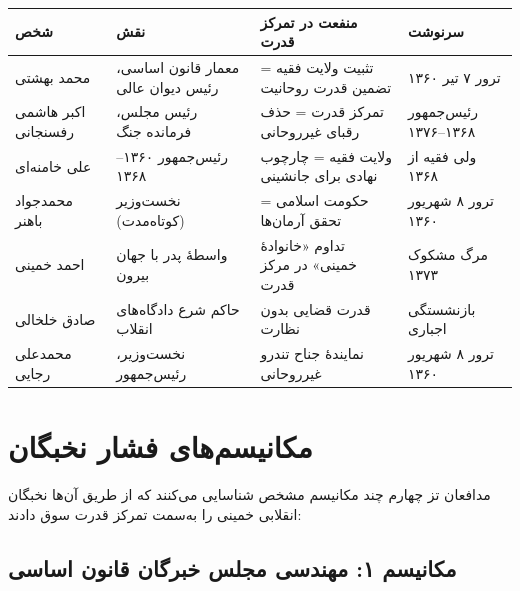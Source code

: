 \documentclass[12pt,a4paper]{book}
\begin{document}
\begin{principleBox}
\begin{longtable}{%
    >{\raggedleft\arraybackslash}p{}
    >{\raggedleft\arraybackslash}p{}
    >{\raggedleft\arraybackslash}p{}
    >{\raggedleft\arraybackslash}p{}}
\toprule
\rowcolor{cConsolid!10}
\textbf{شخص} & \textbf{نقش} & \textbf{منفعت در تمرکز قدرت} & \textbf{سرنوشت} \\
\midrule
\endhead

محمد بهشتی &
معمار قانون اساسی، رئیس دیوان عالی &
تثبیت ولایت فقیه = تضمین قدرت روحانیت &
ترور ۷ تیر ۱۳۶۰ \\
\midrule

اکبر هاشمی رفسنجانی &
رئیس مجلس، فرمانده جنگ &
تمرکز قدرت = حذف رقبای غیرروحانی &
رئیس‌جمهور ۱۳۶۸–۱۳۷۶ \\
\midrule

علی خامنه‌ای &
رئیس‌جمهور ۱۳۶۰–۱۳۶۸ &
ولایت فقیه = چارچوب نهادی برای جانشینی &
ولی فقیه از ۱۳۶۸ \\
\midrule

محمدجواد باهنر &
نخست‌وزیر (کوتاه‌مدت) &
حکومت اسلامی = تحقق آرمان‌ها &
ترور ۸ شهریور ۱۳۶۰ \\
\midrule

احمد خمینی &
واسطهٔ پدر با جهان بیرون &
تداوم «خانوادهٔ خمینی» در مرکز قدرت &
مرگ مشکوک ۱۳۷۳ \\
\midrule

صادق خلخالی &
حاکم شرع دادگاه‌های انقلاب &
قدرت قضایی بدون نظارت &
بازنشستگی اجباری \\
\midrule

محمدعلی رجایی &
نخست‌وزیر، رئیس‌جمهور &
نمایندهٔ جناح تندرو غیرروحانی &
ترور ۸ شهریور ۱۳۶۰ \\

\bottomrule
\end{longtable}
\end{principleBox}

\section{مکانیسم‌های فشار نخبگان}

مدافعان تز چهارم چند مکانیسم مشخص شناسایی می‌کنند که از طریق آن‌ها نخبگان انقلابی خمینی را به‌سمت تمرکز قدرت سوق دادند:

\subsection{مکانیسم ۱: مهندسی مجلس خبرگان قانون اساسی}
\end{document}
